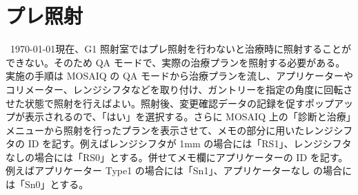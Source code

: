 \documentclass[11pt,a4paper]{jsarticle}
\newcommand{\noindot}{\noindent{$\cdot$}} %
\begin{document}
\section{プレ照射}
\noindot ~\today 現在、G1 照射室ではプレ照射を行わないと治療時に照射することができない。そのため QA モードで、実際の治療プランを照射する必要がある。実施の手順は MOSAIQ の QA モードから治療プランを流し、アプリケーターやコリメーター、レンジシフタなどを取り付け、ガントリーを指定の角度に回転させた状態で照射を行えばよい。照射後、変更確認データの記録を促すポップアップが表示されるので、「はい」を選択する。さらに MOSAIQ 上の「診断と治療」メニューから照射を行ったプランを表示させて、メモの部分に用いたレンジシフタの ID を記す。例えばレンジシフタが 1mm の場合には「RS1」、レンジシフタなしの場合には「RS0」とする。併せてメモ欄にアプリケーターの ID を記す。例えばアプリケーター Type1 の場合には「Sn1」、アプリケーターなし の場合には「Sn0」とする。
%
\end{document}
